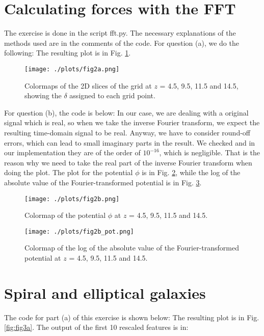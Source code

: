 \section{Calculating forces with the FFT}
The exercise is done in the script fft.py. The necessary explanations of the methods used are in the comments of the code.
For question (a), we do the following: 
The resulting plot is in Fig. \ref{fig:fig2a}.

\begin{figure}[h!]
  \centering
  \texttt{[image: ./plots/fig2a.png]}
  \caption{Colormaps of the 2D slices of the grid at $z$ = 4.5, 9.5, 11.5 and 14.5, showing the $\delta$ assigned to each grid point.} 
  \label{fig:fig2a}
\end{figure}

For question (b), the code is below: 
In our case, we are dealing with a original signal which is real, so when we take the inverse Fourier transform, we expect the resulting time-domain signal to be real.
Anyway, we have to consider round-off errors, which can lead to small imaginary parts in the result. We checked and in our implementation they are of the order of $10^{-16}$, which is negligible.
That is the reason why we need to take the real part of the inverse Fourier transform when doing the plot.
The plot for the potential $\phi$ is in Fig. \ref{fig:fig2b}, while the log of the absolute value of the Fourier-transformed potential is in Fig. \ref{fig:fig2blog}.

\begin{figure}[h!]
  \centering
  \texttt{[image: ./plots/fig2b.png]}
  \caption{Colormap of the potential $\phi$ at $z$ = 4.5, 9.5, 11.5 and 14.5.} 
  \label{fig:fig2b}
\end{figure}

\begin{figure}[h!]
  \centering
  \texttt{[image: ./plots/fig2b\_pot.png]}
  \caption{Colormap of the log of the absolute value of the Fourier-transformed potential at $z$ = 4.5, 9.5, 11.5 and 14.5.} 
  \label{fig:fig2blog}
\end{figure}

\section{Spiral and elliptical galaxies}
The code for part (a) of this exercise is shown below: 
The resulting plot is in Fig. \ref{fig:fig3a}.
The output of the first 10 rescaled features is in: 

